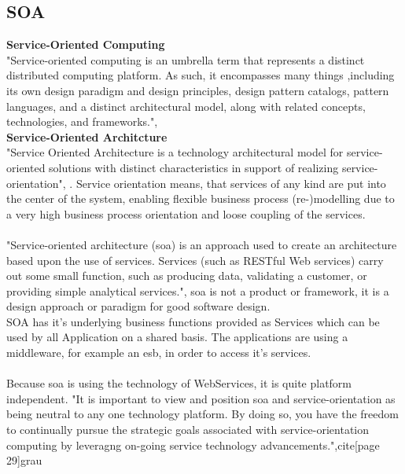 \documentclass[12pt]{article}
\begin{document}
\subsection{SOA}
\textbf{Service-Oriented Computing}\\
"Service-oriented computing is an umbrella term that represents a distinct distributed computing platform. As such, it encompasses many things ,including its own design paradigm and design principles, design pattern catalogs, pattern languages, and a distinct architectural model, along with related concepts, technologies, and frameworks.",\cite[page 22]{grau}\\
\textbf{Service-Oriented Architcture}\\
"Service Oriented Architecture is a technology architectural model for service-oriented solutions with distinct characteristics in support of realizing service-orientation", \cite[page 27]{grau}. Service orientation means, that services of any kind are put into the center of the system, enabling flexible business process (re-)modelling due to a very high business process orientation and loose coupling of the services.\\  \\
"Service-oriented architecture (\gls{soa}) is an approach used to create an architecture based upon the use of services. Services (such as RESTful Web services) carry out some small function, such as producing data, validating a customer, or providing simple analytical services.",\cite{searchsoa} \gls{soa} is not a product or framework, it is a design approach or paradigm for good software design.
\\
SOA has it's underlying business functions provided as Services which can be used by all Application on a shared basis. The applications are using a middleware, for example an \gls{esb}, in order to access it's services. \\
\\Because \gls{soa} is using the technology of WebServices, it is quite platform independent. 
"It is important to view and position \gls{soa} and service-orientation as being neutral to any one technology platform. By doing so, you have the freedom to continually pursue the strategic goals associated with service-orientation computing by leveragng on-going service technology advancements.",cite[page 29]{grau} \\
\end{document}
